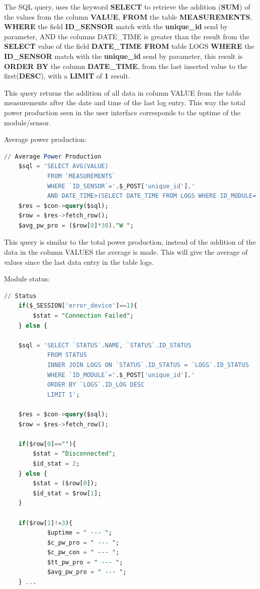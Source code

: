 The SQL query, uses the keyword \textbf{SELECT} to retrieve the addition (\textbf{SUM}) of the values from the column \textbf{VALUE}, \textbf{FROM} the table \textbf{MEASUREMENTS}, \textbf{WHERE} the field \textbf{ID\_SENSOR} match with the \textbf{unique\_id} send by parameter, AND the columns DATE\_TIME is greater than the result from the  \textbf{SELECT} value of the field \textbf{DATE\_TIME FROM} table LOGS \textbf{WHERE} the \textbf{ID\_SENSOR} match with the \textbf{unique\_id} send by parameter, this result is \textbf{ORDER BY} the column \textbf{DATE\_TIME}, from the last inserted value to the first(\textbf{DESC}), with a \textbf{LIMIT} of \textbf{1} result.

This query returns the addition of all data in column VALUE from the table measurements after the date and time of the last log entry. This way the total power production seen in the user interface corresponds to the uptime of the module/sensor.

Average power production:
\begin{lstlisting}[language=sql]
	// Average Power Production
	$sql = 'SELECT AVG(VALUE) 
			FROM `MEASUREMENTS` 
			WHERE `ID_SENSOR`='.$_POST['unique_id'].'
			AND DATE_TIME>(SELECT DATE_TIME FROM LOGS WHERE ID_MODULE='.$_POST['unique_id'].' ORDER BY DATE_TIME DESC LIMIT 1)';
	$res = $con->query($sql);
	$row = $res->fetch_row();
	$avg_pw_pro = ($row[0]*30)."W ";
\end{lstlisting}

This query is similar to the total power production, instead of the addition of the data in the column VALUES the average is made. This will give the average of values since the last data entry in the table logs.

Module status:
\begin{lstlisting}[language=sql]
	// Status
	if($_SESSION['error_device']==1){
		$stat = "Connection Failed";
	} else {
	
	$sql = 'SELECT `STATUS`.NAME, `STATUS`.ID_STATUS
			FROM STATUS 
			INNER JOIN LOGS ON `STATUS`.ID_STATUS = `LOGS`.ID_STATUS
			WHERE `ID_MODULE`='.$_POST['unique_id'].'
			ORDER BY `LOGS`.ID_LOG DESC 
			LIMIT 1';
	
	$res = $con->query($sql);
	$row = $res->fetch_row();
	
	if($row[0]==""){
		$stat = "Disconnected";
		$id_stat = 2;
	} else {
		$stat = ($row[0]);
		$id_stat = $row[1];
	}
	
	if($row[1]!=3){
			$uptime = " --- ";
			$c_pw_pro = " --- ";
			$c_pw_con = " --- ";
			$tt_pw_pro = " --- ";
			$avg_pw_pro = " --- ";
	} ...
\end{lstlisting}

